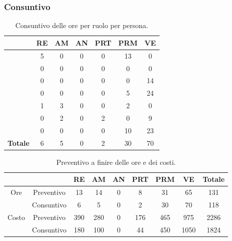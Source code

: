 {{{	\subsubsection{Consuntivo}
	\begin{table}[h!]
		\begin{center}
			\begin{tabular}{l c c c c c c}				
				\toprule
				&	RE& AM& AN& PRT& PRM& VE \\ 
				\midrule
				\BM	&	5	&	0	&	0	&	0	&	13	&	0\\ 
				\BA	&	0	&	0	&	0	&	0	&	0	&	0\\
				\CD	&	0	&	0	&	0	&	0	&	0	&	14\\ 
				\LS	&	0	&	0	&	0	&	0	&	5	&	24\\
				\PV &	1	&	3	&	0	&	0	&	2	&	0\\
				\ZF 	&	0	&	2	&	0	&	2	&	0	&	9\\
				\ZE &	0	&	0	&	0	&	0	&	10	&	23\\ \hline
				\textbf{Totale}&	 6 &	5 &	0	&	2 &		30 & 70\\
				\bottomrule
			\end{tabular}	
		\caption{Consuntivo delle ore per ruolo per persona.}
		\end{center}
	\end{table}
	
		\begin{table}[h!]
		\begin{center}
			\renewcommand{\arraystretch}{1.5}%
			\begin{tabular}{c| c c c c c c c |c }
				
				\toprule
				\multicolumn{2}{c}{}&	RE& AM& AN& PRT& PRM& VE& Totale \\ 
				\midrule
				\multirow{2}{*}{Ore}	& Preventivo & 13& 14& 0&  8& 31 & 65	& 131\\ 
							& Consuntivo & 6 	& 5 	& 0	& 2 & 30 & 70	& 118\\ \hline
				\multirow{2}{*}{Costo}	& Preventivo & 390	& 280	& 0 	& 176 	& 465 	& 975 & 2286\\ 
							& Consuntivo & 180	& 100 & 0 &  44 	& 450	& 1050	& 1824\\
				\bottomrule
			\end{tabular}
		\end{center}
		\caption{Preventivo a finire delle ore e dei costi.}
	\end{table}
	
}}}
